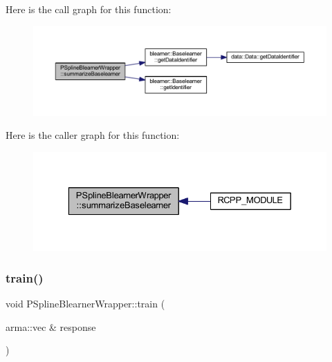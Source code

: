 Here is the call graph for this function\+:\nopagebreak
\begin{figure}[H]
\begin{center}
\leavevmode
\includegraphics[width=350pt]{class_p_spline_blearner_wrapper_a7796ee928de438649ede7aa1aa57263a_cgraph}
\end{center}
\end{figure}
Here is the caller graph for this function\+:\nopagebreak
\begin{figure}[H]
\begin{center}
\leavevmode
\includegraphics[width=329pt]{class_p_spline_blearner_wrapper_a7796ee928de438649ede7aa1aa57263a_icgraph}
\end{center}
\end{figure}
\mbox{\label{class_p_spline_blearner_wrapper_a10193fd93f82c2c333e704d7cb67dd27}} 
\subsubsection{\texorpdfstring{train()}{train()}}
{\footnotesize\ttfamily void P\+Spline\+Blearner\+Wrapper\+::train (\begin{DoxyParamCaption}\item[{arma\+::vec \&}]{response }\end{DoxyParamCaption})\hspace{0.3cm}{\ttfamily [inline]}}

